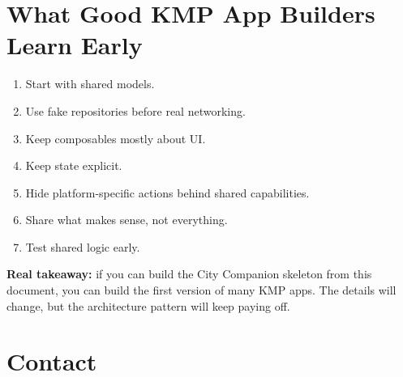 \documentclass[11pt,a4paper]{article}
\begin{document}
\section{What Good KMP App Builders Learn Early}

\begin{enumerate}
    \item Start with shared models.
    \item Use fake repositories before real networking.
    \item Keep composables mostly about UI.
    \item Keep state explicit.
    \item Hide platform-specific actions behind shared capabilities.
    \item Share what makes sense, not everything.
    \item Test shared logic early.
\end{enumerate}

\begin{kazehighlightbox}
\textbf{Real takeaway:} if you can build the City Companion skeleton from this document, you can build the first version of many KMP apps. The details will change, but the architecture pattern will keep paying off.
\end{kazehighlightbox}

\section{Contact}

\KazeContactBlock
\end{document}
